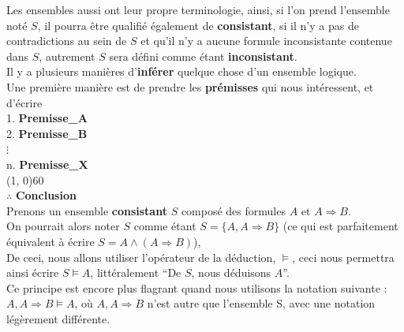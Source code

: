\documentclass[a4paper, 12pt]{article}
\newcommand{\imply}{\Rightarrow}
\numberwithin{equation}{subsection}
\begin{document}
  Les ensembles aussi ont leur propre terminologie, ainsi, si l'on prend l'ensemble noté $S$, il pourra être qualifié également de {\bf consistant}, si il n'y a pas de contradictions au sein de $S$ et qu'il n'y a aucune formule inconsistante contenue dans $S$, autrement $S$ sera défini comme étant {\bf inconsistant}. \\[0.5cm]
  Il y a plusieurs manières d'{\bf inférer} quelque chose d'un ensemble logique. \\
  Une première manière est de prendre les {\bf prémisses} qui nous intéressent, et d'écrire \\[0.5cm]
    1. {\bf Premisse\_A} \\
    2. {\bf Premisse\_B} \\
    \hspace{0.2cm}$\vdots$ \\
    n. {\bf Premisse\_X} \\
    \hspace{0.5cm}\line(1, 0){60} \\
    $\therefore$ {\bf Conclusion} \\[0.5cm]
  Prenons un ensemble {\bf consistant} $S$ composé des formules $A$ et $A \imply B$. \\
  On pourrait alors noter $S$ comme étant $S = \{ A, A \imply B \}$ (ce qui est parfaitement équivalent à écrire $S = A \land (A \imply B)$), \\
  De ceci, nous allons utiliser l'opérateur de la déduction, $\vDash$, ceci nous permettra ainsi écrire $S \vDash A$, littéralement ``De $S$, nous déduisons $A$''. \\Ce principe est encore plus flagrant quand nous utilisons la notation suivante : $A, A \imply B \models A$, où $A, A \imply B$ n'est autre que l'ensemble S, avec une notation légèrement différente. \\[0.5cm]
\end{document}
